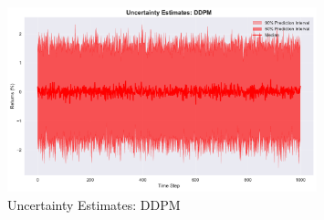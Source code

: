 \begin{figure}[htbp]
\centering
\includegraphics[width=0.8\textwidth]{figures/uncertainty_ddpm.pdf}
\caption{Uncertainty Estimates: DDPM}
\label{fig:uncertaintyddpm}
\end{figure}
